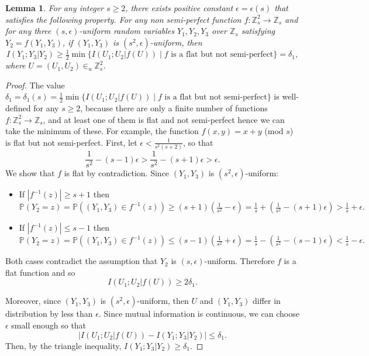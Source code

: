 \documentclass{birkjour}
\newtheorem{lem}[thm]{Lemma}
\theoremstyle{indenteddefinition}
\theoremstyle{indenteddefinition}
\numberwithin{equation}{section}
\renewcommand{\P}{\mathbb{P}}
\newcommand{\Z}{\mathbb{Z}}
\begin{document}
\begin{lem}
\label{lem:alpha} 
For any integer $s \geq 2$, there exists positive constant $\epsilon = \epsilon(s)$ that satisfies the following property. 
For any non semi-perfect function $f : \Z_s^2 \rightarrow \Z_s$ and for any three $(s,\epsilon)$-uniform random variables $Y_1,Y_2,Y_3$ over $\Z_s$ satisfying $Y_2 = f(Y_1,Y_3)$, if $(Y_1,Y_3)$ is $(s^2,\epsilon)$-uniform, then 
  $$ I(Y_1;Y_3|Y_2) \geq \tfrac{1}{2} \min \big\{ I(U_1;U_2|f(U)) \; \big| \; f \mbox{ is a flat but not semi-perfect} \big\} = \delta_1,$$
where $U = (U_1,U_2) \in_u \Z_s^2$.
\end{lem}
\begin{proof}
The value $\delta_1=\delta_1(s) = \tfrac{1}{2} \min \big\{ I(U_1;U_2|f(U)) \; \big| \; f \mbox{ is a flat but not semi-perfect} \big\}$ is well-defined for any $s \geq 2$, because there are only a finite number of functions $f : \Z_s^2 \rightarrow \Z_s$, and at least one of them is flat and not semi-perfect hence we can take the minimum of these. For example, the function $f(x,y) = x+y$ (mod $s$) is flat but not semi-perfect. 
First, let $\epsilon < \frac{1}{s^2(s+2)}$, so that 
	$$ \frac{1}{s^2} - (s-1)\epsilon > \frac{1}{s^2} - (s+1)\epsilon > \epsilon. $$ 
We show that $f$ is flat by contradiction. Since $(Y_1,Y_3)$ is $(s^2,\epsilon)$-uniform: 
\begin{itemize}
\item If $| f^{-1}(z) | \geq s+1$ then 
	$$ \P(Y_2=z) = \P( (Y_1,Y_3) \in f^{-1}(z)) \geq (s+1) \left( \tfrac{1}{s^2} - \epsilon \right) 
	= \tfrac{1}{s} + \left( \tfrac{1}{s^2} - (s+1)\epsilon \right) > \tfrac{1}{s} + \epsilon. $$
\item If $| f^{-1}(z) | \leq s-1$ then 
	$$ \P(Y_2=z) = \P( (Y_1,Y_3) \in f^{-1}(z)) \leq (s-1) \left( \tfrac{1}{s^2} + \epsilon \right) 
	= \tfrac{1}{s} - \left( \tfrac{1}{s^2} - (s-1)\epsilon \right) < \tfrac{1}{s} - \epsilon. $$
\end{itemize}
Both cases contradict the assumption that $Y_2$ is $(s,\epsilon)$-uniform. Therefore $f$ is a flat function and so $$I(U_1;U_2|f(U)) \geq 2\delta_1.$$

Moreover, since $(Y_1,Y_3)$ is $(s^2,\epsilon)$-uniform, then $U$ and $(Y_1,Y_3)$ differ in distribution by less than $\epsilon$. Since mutual information is continuous, we can choose $\epsilon$ small enough so that 
	$$ \big| I(U_1;U_2|f(U)) - I(Y_1;Y_3|Y_2) \big| \leq \delta_1. $$
Then, by the triangle inequality, 
$I(Y_1;Y_3|Y_2) \geq \delta_1$.


\end{proof}
\end{document}
